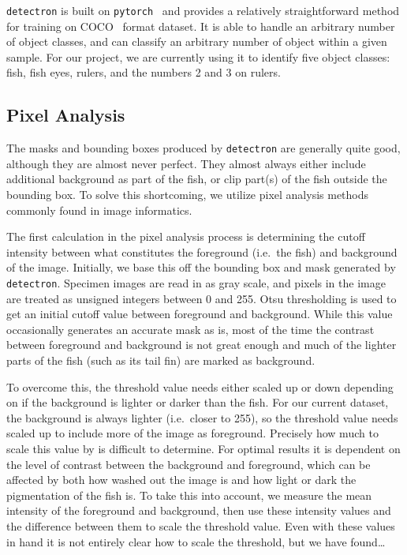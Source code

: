 \documentclass[screen,review]{acmart}
\begin{document}
\verb|detectron| is built on \verb|pytorch|~\cite{NEURIPS2019_9015} and provides a relatively straightforward method for training on COCO~\cite{DBLP:journals/corr/LinMBHPRDZ14} format dataset. It is able to handle an arbitrary number of object classes, and can classify an arbitrary number of object within a given sample. For our project, we are currently using it to identify five object classes: fish, fish eyes, rulers, and the numbers 2 and 3 on rulers.
\subsection{Pixel Analysis}
The masks and bounding boxes produced by \verb|detectron| are generally quite good, although they are almost never perfect. They almost always either include additional background as part of the fish, or clip part(s) of the fish outside the bounding box. To solve this shortcoming, we utilize pixel analysis methods commonly found in image informatics.

The first calculation in the pixel analysis process is determining the cutoff intensity between what constitutes the foreground (i.e.\ the fish) and background of the image. Initially, we base this off the bounding box and mask generated by \verb|detectron|. Specimen images are read in as gray scale, and pixels in the image are treated as unsigned integers between 0 and 255. Otsu thresholding is used to get an initial cutoff value between foreground and background.  While this value occasionally generates an accurate mask as is, most of the time the contrast between foreground and background is not great enough and much of the lighter parts of the fish (such as its tail fin) are marked as background.

To overcome this, the threshold value needs either scaled up or down depending on if the background is lighter or darker than the fish. For our current dataset, the background is always lighter (i.e.\ closer to 255), so the threshold value needs scaled up to include more of the image as foreground. Precisely how much to scale this value by is difficult to determine. For optimal results it is dependent on the level of contrast between the background and foreground, which can be affected by both how washed out the image is and how light or dark the pigmentation of the fish is. To take this into account, we measure the mean intensity of the foreground and background, then use these intensity values and the difference between them to scale the threshold value. Even with these values in hand it is not entirely clear how to scale the threshold, but we have found\ldots{}
\end{document}
